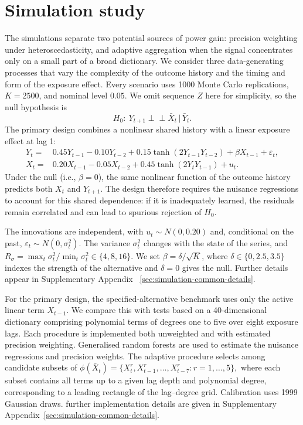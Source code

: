\documentclass[12pt]{article}
\newcommand{\indep}{\perp \!\!\! \perp}
\newcommand\given{\,|\,}
\numberwithin{equation}{section}
\begin{document}
\section{Simulation study}
\label{sec:simulation}

The simulations separate two potential sources of power gain: precision weighting under heteroscedasticity, and adaptive aggregation when the signal concentrates only on a small part of a broad dictionary. We consider three data-generating processes that vary the complexity of the outcome history and the timing and form of the exposure effect. Every scenario uses 1000 Monte Carlo replications, \(K=2500\), and nominal level \(0.05\). We omit sequence $Z$ here for simplicity, so the null hypothesis is
\begin{equation}
\label{eq:sim-null}
H_0:~
Y_{t+1} \indep \bar X_t
\given \bar Y_t.
\end{equation}
The primary design combines a nonlinear shared history with a
linear exposure effect at lag 1:
\begin{align}
Y_t={}&0.45Y_{t-1}-0.10Y_{t-2}
 +0.15\tanh(2Y_{t-1}Y_{t-2})
 +\beta X_{t-1}+\varepsilon_t,
\label{eq:sim-shared-y}\\
X_t={}&0.20X_{t-1}-0.05X_{t-2}
 +0.45\tanh(2Y_tY_{t-1})+u_t.
\label{eq:sim-shared-x}
\end{align}
Under the null (i.e., $\beta=0$), the same nonlinear function of the outcome history predicts both \(X_t\) and \(Y_{t+1}\). The design therefore requires the nuisance regressions to account for this shared dependence: if it is inadequately learned, the residuals remain correlated and can lead to spurious rejection of $H_0$.

The innovations are independent, with
\(u_t\sim N(0,0.20)\) and, conditional on the past,
\(\varepsilon_t\sim N(0,\sigma_t^2)\). The variance \(\sigma_t^2\) changes
with the state of the series, and
\(R_\sigma=\max_t\sigma_t^2/\min_t\sigma_t^2\in\{4,8,16\}\).
We set \(\beta=\delta/\sqrt K\), where
\(\delta\in\{0,2.5,3.5\}\) indexes the strength of the alternative and
\(\delta=0\) gives the null. Further details appear in Supplementary
Appendix~
\ref{sec:simulation-common-details}.

For the primary design, the specified-alternative benchmark uses only the active linear term \(X_{t-1}\). We compare this with tests based on a 40-dimensional dictionary comprising polynomial terms of degrees one to five over eight exposure lags. Each procedure is implemented both unweighted and with estimated precision weighting. Generalised random forests \citep{athey2019generalized} are used to estimate the nuisance regressions and precision weights. The adaptive procedure selects among candidate subsets of $\phi(\bar X_t) = \{ X_t^r, X_{t-1}^r,\ldots,X_{t-7}^r: r=1,\ldots,5\},$ where each subset contains all terms up to a given lag depth and polynomial degree, corresponding to a leading rectangle of the lag--degree grid. Calibration uses 1999 Gaussian draws. further implementation details are given in Supplementary Appendix~\ref{sec:simulation-common-details}.
\end{document}
